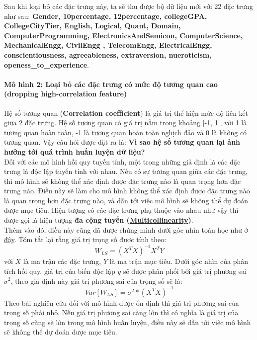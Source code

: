 \documentclass{report}
\begin{document}
    Sau khi loại bỏ các đặc trưng này, ta sẽ thu được bộ dữ liệu mới với 22 đặc trưng như sau:
    \textbf{Gender, 10percentage, 12percentage, collegeGPA, CollegeCityTier, English, Logical, Quant, Domain, ComputerProgramming, ElectronicsAndSemicon, ComputerScience, MechanicalEngg, CivilEngg , TelecomEngg, ElectricalEngg, conscientiousness, agreeableness, extraversion, nueroticism, openess\_to\_experience}.        
    
    \paragraph{Mô hình 2: Loại bỏ các đặc trưng có mức độ tương quan cao (dropping high-correlation feature)}\label{sec:dropping-correlation-feature}
    Hệ số tương quan (\textbf{Correlation coefficient}) là giá trị thể hiện mức độ liên kết giữa 2 đặc trưng. Hệ số tương quan có giá trị nằm trong khoảng [-1, 1], với 1 là tương quan hoàn toàn, -1 là tương quan hoàn toàn nghịch đảo và 0 là không có tương quan. Vậy câu hỏi được đặt ra là: \textbf{Vì sao hệ số tương quan lại ảnh hưởng tới quá trình huấn luyện dữ liệu?}\\ 
    
    Đối với các mô hình hồi quy tuyến tính, một trong những giả định là các đặc trưng là độc lập tuyến tính với nhau. Nếu có sự tương quan giữa các đặc trưng, thì mô hình sẽ không thể xác định được đặc trưng nào là quan trọng hơn đặc trưng nào. Điều này sẽ làm cho mô hình không thể xác định được đặc trưng nào là quan trọng hơn đặc trưng nào, và dẫn tới việc mô hình sẽ không thể dự đoán được mục tiêu. Hiện tượng có các đặc trưng phụ thuộc vào nhau như vậy thì được gọi là hiện tượng \textbf{đa cộng tuyến (\href{https://en.wikipedia.org/wiki/Multicollinearity}{Multicollinearity})}.\\

    Thêm vào đó, điều này cũng đã được chứng minh dưới góc nhìn toán học như ở \href{https://www.quora.com/Why-is-it-important-to-remove-correlated-variables-when-performing-machine-learning-If-2-variables-are-correlated-how-do-you-choose-which-one-to-exclude-from-the-data-set}{đây}. Tóm tắt lại rằng giá trị trọng số được tính theo:
        \begin{equation}
            W_{LS} = (X^T  X)^{-1}  X^T  Y
        \end{equation}
    với $X$ là ma trận các đặc trưng, $Y$ là ma trận mục tiêu. Dưới góc nhìn của phân tích hồi quy, giá trị của biến độc lập $y$ sẽ được phân phối bởi giá trị phương sai \textbf{$\sigma^2$}, theo giả định này giá trị phương sai của trọng số sẽ là:
        \begin{equation}
            Var[W_{LS}] = \sigma^2 * (X^T X)^{-1} 
        \end{equation}
    Theo bài nghiên cứu đối với mô hình được ổn định thì giá trị phương sai của trọng số phải nhỏ. Nếu giá trị phương sai càng lớn thì có nghĩa là giá trị của trọng số cũng sẽ lớn trong mô hình huấn luyện, điều này sẽ dẫn tới việc mô hình sẽ không thể dự đoán được mục tiêu.
\end{document}
